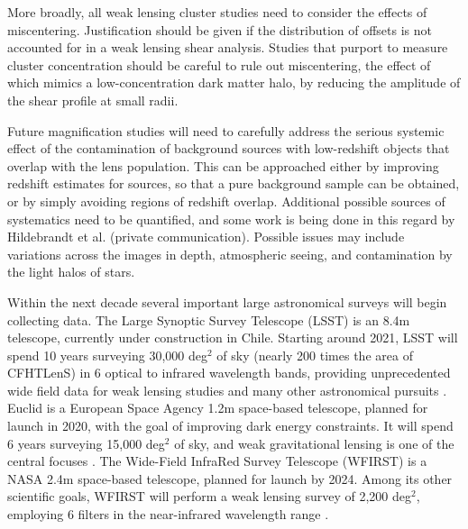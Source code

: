 More broadly, all weak lensing cluster studies need to consider the effects of miscentering. Justification should be given if the distribution of offsets is not accounted for in a weak lensing shear analysis. Studies that purport to measure cluster concentration should be careful to rule out miscentering, the effect of which mimics a low-concentration dark matter halo, by reducing the amplitude of the shear profile at small radii. 

Future magnification studies will need to carefully address the serious systemic effect of the contamination of background sources with low-redshift objects that overlap with the lens population. This can be approached either by improving redshift estimates for sources, so that a pure background sample can be obtained, or by simply avoiding regions of redshift overlap. Additional possible sources of systematics need to be quantified, and some work is being done in this regard by Hildebrandt et al. (private communication). Possible issues may include variations across the images in depth, atmospheric seeing, and contamination by the light halos of stars.

Within the next decade several important large astronomical surveys will begin collecting data. The Large Synoptic Survey Telescope (LSST) is an 8.4m telescope, currently under construction in Chile. Starting around 2021, LSST will spend 10 years surveying 30,000 deg$^2$ of sky (nearly 200 times the area of \ac{CFHTLenS}) in 6 optical to infrared wavelength bands, providing unprecedented wide field data for weak lensing studies and many other astronomical pursuits \citep{LSST2.0}. Euclid is a European Space Agency 1.2m space-based telescope, planned for launch in 2020, with the goal of improving dark energy constraints. It will spend 6 years surveying 15,000 deg$^2$ of sky, and weak gravitational lensing is one of the central focuses \citep{Euclid}. The Wide-Field InfraRed Survey Telescope (WFIRST) is a NASA 2.4m space-based telescope, planned for launch by 2024. Among its other scientific goals, WFIRST will perform a weak lensing survey of 2,200 deg$^2$, employing 6 filters in the near-infrared wavelength range \citep{WFIRST}.

